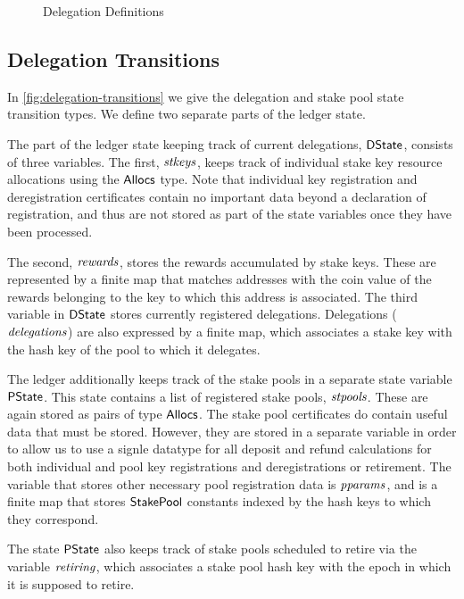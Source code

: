 \begin{figure}
  \caption{Delegation Definitions}
  \label{fig:delegation-definitons}
\end{figure}



\subsection{Delegation Transitions}
\label{sec:deleg-trans}


In \cref{fig:delegation-transitions} we give the delegation and stake pool
state transition types. We define two separate parts of the ledger state.

The part of the ledger state keeping track of current delegations, $\mathsf{DState}$,
consists of three variables. The first, $\mathit{stkeys}$, keeps track of individual
stake key resource allocations using the $\mathsf{Allocs}$ type.
Note that individual key registration
and deregistration certificates contain no important data beyond a declaration
of registration, and thus are not stored as part of the state variables once
they have been processed.

The second, $\mathit{rewards}$, stores the
rewards accumulated by stake keys. These are represented by
a finite
map that matches addresses with the coin value of the rewards belonging to the
key to which this address is associated. The third
variable in $\mathsf{DState}$ stores currently registered delegations.
Delegations ($\mathit{delegations}$) are also expressed by a finite map, which
associates a stake key with the hash key of the pool to which it delegates.

The ledger additionally keeps track of the stake pools in a separate state variable
$\mathsf{PState}$.
This state contains a list of registered stake pools, $\mathit{stpools}$.
These are again stored as pairs of type $\mathsf{Allocs}$. The stake pool certificates
do contain useful data that must be stored. However, they are stored in a
separate variable in order to allow us to use a signle datatype for
all deposit and refund calculations for both individual and pool key registrations
and deregistrations or retirement. The variable that stores other necessary pool
registration data is $\mathit{pparams}$, and is a finite map that stores $\mathsf{StakePool}$
constants indexed
by the hash keys to which they correspond.

The state $\mathsf{PState}$ also keeps track of
stake pools scheduled to retire via the variable $\mathit{retiring}$,
which associates
a stake pool hash key with the epoch in which it is supposed to retire.

